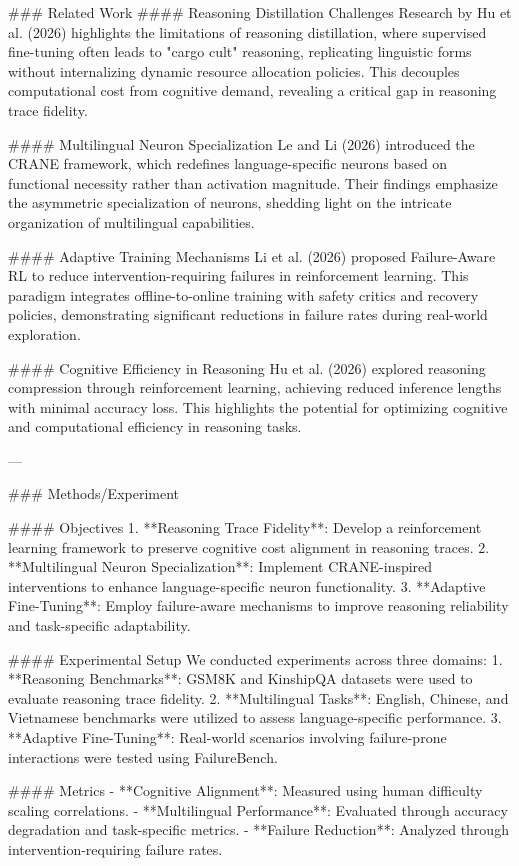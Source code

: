 ### Related Work
#### Reasoning Distillation Challenges
Research by Hu et al. (2026) highlights the limitations of reasoning distillation, where supervised fine-tuning often leads to "cargo cult" reasoning, replicating linguistic forms without internalizing dynamic resource allocation policies. This decouples computational cost from cognitive demand, revealing a critical gap in reasoning trace fidelity.

#### Multilingual Neuron Specialization
Le and Li (2026) introduced the CRANE framework, which redefines language-specific neurons based on functional necessity rather than activation magnitude. Their findings emphasize the asymmetric specialization of neurons, shedding light on the intricate organization of multilingual capabilities.

#### Adaptive Training Mechanisms
Li et al. (2026) proposed Failure-Aware RL to reduce intervention-requiring failures in reinforcement learning. This paradigm integrates offline-to-online training with safety critics and recovery policies, demonstrating significant reductions in failure rates during real-world exploration.

#### Cognitive Efficiency in Reasoning
Hu et al. (2026) explored reasoning compression through reinforcement learning, achieving reduced inference lengths with minimal accuracy loss. This highlights the potential for optimizing cognitive and computational efficiency in reasoning tasks.

---

### Methods/Experiment

#### Objectives
1. **Reasoning Trace Fidelity**: Develop a reinforcement learning framework to preserve cognitive cost alignment in reasoning traces.
2. **Multilingual Neuron Specialization**: Implement CRANE-inspired interventions to enhance language-specific neuron functionality.
3. **Adaptive Fine-Tuning**: Employ failure-aware mechanisms to improve reasoning reliability and task-specific adaptability.

#### Experimental Setup
We conducted experiments across three domains:
1. **Reasoning Benchmarks**: GSM8K and KinshipQA datasets were used to evaluate reasoning trace fidelity.
2. **Multilingual Tasks**: English, Chinese, and Vietnamese benchmarks were utilized to assess language-specific performance.
3. **Adaptive Fine-Tuning**: Real-world scenarios involving failure-prone interactions were tested using FailureBench.

#### Metrics
- **Cognitive Alignment**: Measured using human difficulty scaling correlations.
- **Multilingual Performance**: Evaluated through accuracy degradation and task-specific metrics.
- **Failure Reduction**: Analyzed through intervention-requiring failure rates.

